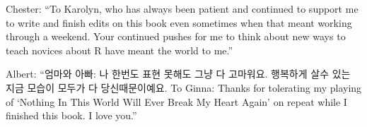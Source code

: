 \cleardoublepage\newpage
\thispagestyle{empty}

\begin{center}
Chester: ``To Karolyn, who has always been patient and continued to support me to write and finish edits on this book even sometimes when that meant working through a weekend.  Your continued pushes for me to think about new ways to teach novices about R have meant the world to me.''

Albert: ``엄마와 아빠: 나 한번도 표현 못해도 그냥 다 고마워요. 행복하게 살수 있는 지금 모습이 모두가 다 당신때문이예요. To Ginna: Thanks for tolerating my playing of `Nothing In This World Will Ever Break My Heart Again' on repeat while I finished this book. I love you.''
\end{center}

\setlength{\abovedisplayskip}{-5pt}
\setlength{\abovedisplayshortskip}{-5pt}
